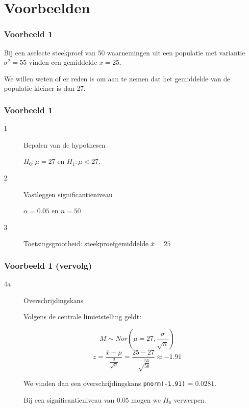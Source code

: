 \documentclass[aspectratio=169]{beamer}
\begin{document}
\section{Voorbeelden}

\begin{frame}
  \frametitle{Voorbeeld 1}
  Bij een aselecte steekproef van 50 waarnemingen uit een populatie met variantie $\sigma^2 = 55$ vinden een gemiddelde $\overline{x} = 25$.
  
  We willen weten of er reden is om aan te nemen dat het gemiddelde van de populatie kleiner is dan 27.
  
\end{frame}

\begin{frame}
  \frametitle{Voorbeeld 1}
  
  \begin{description}
    \item[1] Bepalen van de hypothesen
    
    $H_{0} : \mu = 27$ en $H_{1}: \mu < 27$.
    
    \item[2] Vastleggen significantieniveau
    
    $\alpha = 0.05$ en $n=50$
    
    \item[3] Toetsingsgrootheid: steekproefgemiddelde $\overline{x} = 25$
    
  \end{description}
\end{frame}

\begin{frame}[plain]
  \frametitle{Voorbeeld 1 (vervolg)}
  
  \begin{description}
    \item[4a] Overschrijdingskans
    
    Volgens de centrale limietstelling geldt:
    
    \[ M \sim Nor(\mu = 27, \frac{\sigma}{\sqrt{n}}) \]
    \[ z = \frac{\overline{x} - \mu}{\frac{\sigma}{\sqrt{n}}} = \frac{25-27}{\sqrt\frac{55}{50}} \approx -1.91\]
    
    We vinden dan een overschrijdingskans \texttt{pnorm(-1.91)} = $0.0281$.
    
    Bij een significantieniveau van 0.05 mogen we $H_{0}$ verwerpen.
  \end{description}
  
\end{frame}
\end{document}
